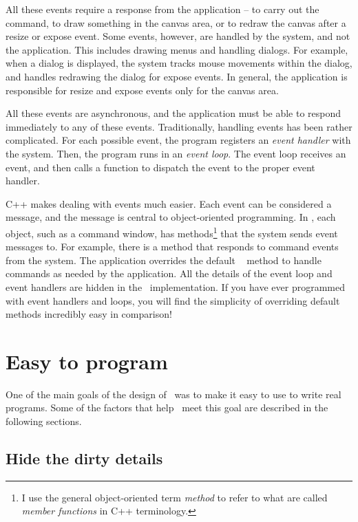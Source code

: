 All these events require a response from the application --
to carry out the command, to draw something in the canvas area,
or to redraw the canvas after a resize or expose event. Some
events, however, are handled by the system, and not the
application. This includes drawing menus and handling dialogs.
For example, when a dialog is displayed, the system tracks mouse
movements within the dialog, and handles redrawing the dialog for
expose events. In general, the application is responsible for
resize and expose events only for the canvas area.

All these events are asynchronous, and the application must be able
to respond immediately to any of these events. Traditionally, 
handling events has been rather complicated. For each possible
event, the program registers an \emph{event handler} with
the system. Then, the program runs in an \emph{event loop}.
The event loop receives an event, and then calls a
function to dispatch the event to the proper event handler.

C++ makes dealing with events much easier. Each event can be considered
a message, and the message is central to object-oriented
programming. In \V, each object, such as a command window, has
methods\footnote{I use the general object-oriented term \emph{method}
to refer to what are called \emph{member functions} in C++
terminology.} that the system sends event messages to. For
example, there is a  method that responds to
command events from the system. The application overrides the
default \V\  method to handle commands as
needed by the application. All the details of the event loop and
event handlers are hidden in the \V\ implementation. If you have
ever programmed with event handlers and loops, you will find the
simplicity of overriding default methods incredibly easy in
comparison!

\section{Easy to program}

One of the main goals of the design of \V\ was to make it easy to
use to write real programs. Some of the factors that help \V\ meet
this goal are described in the following sections.

\subsection*{Hide the dirty details}

